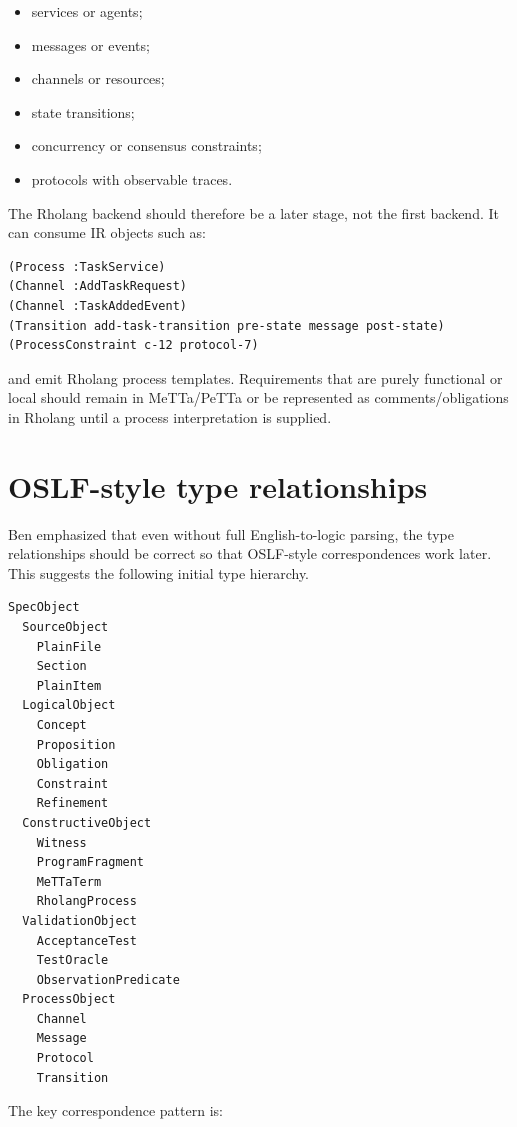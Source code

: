 \documentclass[11pt]{article}
\begin{document}
\begin{itemize}[nosep]
\item services or agents;
\item messages or events;
\item channels or resources;
\item state transitions;
\item concurrency or consensus constraints;
\item protocols with observable traces.
\end{itemize}

The Rholang backend should therefore be a later stage, not the first backend.
It can consume IR objects such as:

\begin{verbatim}
(Process :TaskService)
(Channel :AddTaskRequest)
(Channel :TaskAddedEvent)
(Transition add-task-transition pre-state message post-state)
(ProcessConstraint c-12 protocol-7)
\end{verbatim}

and emit Rholang process templates. Requirements that are purely functional or
local should remain in MeTTa/PeTTa or be represented as comments/obligations in
Rholang until a process interpretation is supplied.

\section{OSLF-style type relationships}

Ben emphasized that even without full English-to-logic parsing, the type
relationships should be correct so that OSLF-style correspondences work later.
This suggests the following initial type hierarchy.

\begin{verbatim}
SpecObject
  SourceObject
    PlainFile
    Section
    PlainItem
  LogicalObject
    Concept
    Proposition
    Obligation
    Constraint
    Refinement
  ConstructiveObject
    Witness
    ProgramFragment
    MeTTaTerm
    RholangProcess
  ValidationObject
    AcceptanceTest
    TestOracle
    ObservationPredicate
  ProcessObject
    Channel
    Message
    Protocol
    Transition
\end{verbatim}

The key correspondence pattern is:
\end{document}
